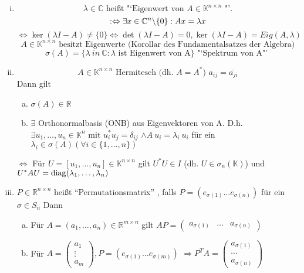 \begin{enumerate}[(i)]
\item
\[
\lambda \in \mathbb{C}\text{ heißt "`Eigenwert von } A \in 
\mathbb{K}^{n \times n} \text{ "'.} \]
\[
: \Leftrightarrow \exists x \in \mathbb{C}^n \backslash \{0\}: Ax = \lambda x \\
\]\[
\Leftrightarrow \ker (\lambda I -A) \neq \{0\} \Leftrightarrow 
\det (\lambda I -A) =0, \ker (\lambda I-A) = Eig (A, \lambda)
\]\[
A \in \mathbb{K}^{n \times n} \text{ besitzt Eigenwerte (Korollar des 
Fundamentalsatzes der Algebra)}
\]\[
\sigma (A) = \{ \lambda \ in~ \mathbb{C}: \lambda \text{ ist Eigenwert 
von A}\} \text{ "`Spektrum von A"' }
\]
\item
\[
A \in \mathbb{K}^{n \times n} \text{ Hermitesch (dh. } A = A^\ast \text{) } a_{ij} = \overline{a_{ji}}
\]
Dann gilt 
\begin{enumerate}[(a)]
\item
$ \sigma(A) \in \mathbb{R}$
\item
$\exists$ Orthonormalbasis (ONB) aus Eigenvektoren von A. D.h. $\exists u_1, \dots, u_n \in \mathbb{K}^n \text{ mit } u_i^\ast u_j = \delta_{ij}$
$\land A~u_i = \lambda_i~u_i$ für ein $\lambda_i \in \sigma(A) 
(\forall i \in \{1, \dots, n\})$  
\end{enumerate}
$\Leftrightarrow$ Für $U = [u_1, \dots, u_n] \in \mathbb{K}^{n\times n}$ gilt $U^\ast U \in I$
(dh. $U \in \sigma_n(\mathbb{K})$) und 
$U^\ast AU = \operatorname*{\mathrm{diag}}(\lambda_1, \dots, \lambda_n)$  

\item
	$P \in \mathbb{R}^{n \times n}$ heißt "`Permutationsmatrix"' , falls $P=(e_{\sigma(1)} \dots e_{\sigma(n)})$ für ein $\sigma \in S_n$
	Dann 
	\begin{enumerate}[(a)]
	\item Für $A = (a_1, \dots, a_n) \in \mathbb{R}^{m \times n}$ gilt
	$AP = \begin{pmatrix} a_{\sigma(1)} & \dots & a_{\sigma(n)}\end{pmatrix}$
	\item
	Für $A = \begin{pmatrix} a_1 \\ \vdots \\ a_m \end{pmatrix}, P = (e_{\sigma(1)} \dots e_{\sigma(m)})$
	$\Rightarrow P^T A = \begin{pmatrix} a_{\sigma(1)} \\ \cdots \\ a_{\sigma(n)}  \end{pmatrix}$
\end{enumerate}
\end{enumerate}
